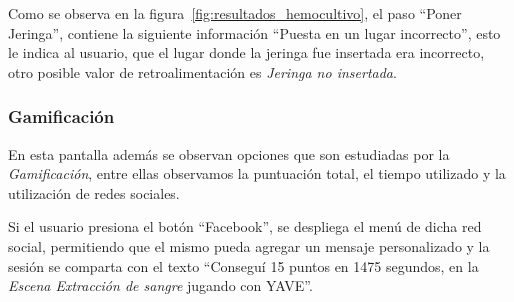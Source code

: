 Como se observa en la figura~\ref{fig:resultados_hemocultivo}, el paso
\enquote{Poner Jeringa}, contiene la siguiente información \enquote{Puesta en un
    lugar incorrecto}, esto le indica al usuario, que el lugar donde la jeringa
fue insertada era incorrecto, otro posible valor de retroalimentación es
\emph{Jeringa no insertada}.

\subsubsection{Gamificación}

En esta pantalla además se observan opciones que son estudiadas por la
\emph{Gamificación}, entre ellas observamos la puntuación total, el tiempo
utilizado y la utilización de redes sociales.

Si el usuario presiona el botón \enquote{Facebook}, se despliega el menú de
dicha red social, permitiendo que el mismo pueda agregar un mensaje
personalizado y la sesión se comparta con el texto \enquote{Conseguí 15 puntos
    en 1475 segundos, en la \emph{Escena Extracción de sangre} jugando con
    YAVE}.

